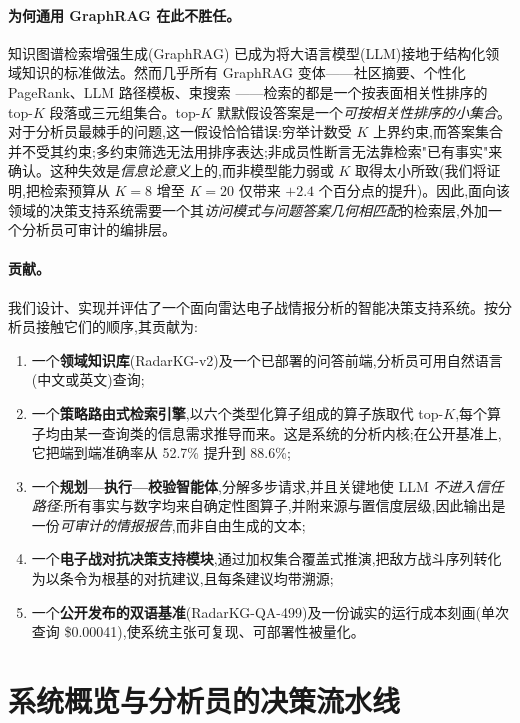\documentclass[11pt,a4paper]{article}
\begin{document}
\paragraph{为何通用 GraphRAG 在此不胜任。}
知识图谱检索增强生成(GraphRAG)\citep{edge2024graphrag,gutierrez2024hipporag,peng2025graphrag} 已成为将大语言模型(LLM)接地于结构化领域知识的标准做法。然而几乎所有 GraphRAG 变体——社区摘要、个性化 PageRank、LLM 路径模板、束搜索 \citep{luo2024rog,sun2024tog,ma2025tog2}——检索的都是一个按表面相关性排序的 top-$K$ 段落或三元组集合。top-$K$ 默默假设答案是一个\emph{可按相关性排序的小集合}。对于分析员最棘手的问题,这一假设恰恰错误:穷举计数受 $K$ 上界约束,而答案集合并不受其约束;多约束筛选无法用排序表达;非成员性断言无法靠检索"已有事实"来确认。这种失效是\emph{信息论意义}上的,而非模型能力弱或 $K$ 取得太小所致(我们将证明,把检索预算从 $K{=}8$ 增至 $K{=}20$ 仅带来 $+2.4$ 个百分点的提升)。因此,面向该领域的决策支持系统需要一个其\emph{访问模式与问题答案几何相匹配}的检索层,外加一个分析员可审计的编排层。

\paragraph{贡献。}
我们设计、实现并评估了一个面向雷达电子战情报分析的智能决策支持系统。按分析员接触它们的顺序,其贡献为:
\begin{enumerate}[leftmargin=1.4em,itemsep=2pt]
\item 一个\textbf{领域知识库}(RadarKG-v2)及一个已部署的问答前端,分析员可用自然语言(中文或英文)查询;
\item 一个\textbf{策略路由式检索引擎},以六个类型化算子组成的算子族取代 top-$K$,每个算子均由某一查询类的信息需求推导而来。这是系统的分析内核;在公开基准上,它把端到端准确率从 52.7\% 提升到 88.6\%;
\item 一个\textbf{规划—执行—校验智能体},分解多步请求,并且关键地使 LLM \emph{不进入信任路径}:所有事实与数字均来自确定性图算子,并附来源与置信度层级,因此输出是一份\emph{可审计的情报报告},而非自由生成的文本;
\item 一个\textbf{电子战对抗决策支持模块},通过加权集合覆盖式推演,把敌方战斗序列转化为以条令为根基的对抗建议,且每条建议均带溯源;
\item 一个\textbf{公开发布的双语基准}(RadarKG-QA-499)及一份诚实的运行成本刻画(单次查询 \$0.00041),使系统主张可复现、可部署性被量化。
\end{enumerate}

\section{系统概览与分析员的决策流水线}
\label{sec:overview}
\end{document}

